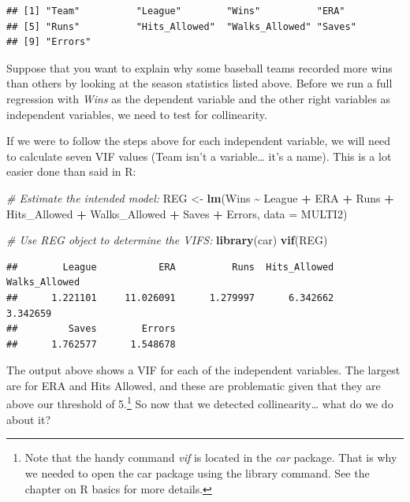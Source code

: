 \documentclass[
]{book}
\newenvironment{Shaded}{\begin{snugshade}}{\end{snugshade}}
\newcommand{\AttributeTok}[1]{\textcolor[rgb]{0.13,0.29,0.53}{#1}}
\newcommand{\CommentTok}[1]{\textcolor[rgb]{0.56,0.35,0.01}{\textit{#1}}}
\newcommand{\FunctionTok}[1]{\textcolor[rgb]{0.13,0.29,0.53}{\textbf{#1}}}
\newcommand{\NormalTok}[1]{#1}
\newcommand{\OtherTok}[1]{\textcolor[rgb]{0.56,0.35,0.01}{#1}}
\newcommand{\SpecialCharTok}[1]{\textcolor[rgb]{0.81,0.36,0.00}{\textbf{#1}}}
\begin{document}
\begin{verbatim}
## [1] "Team"          "League"        "Wins"          "ERA"          
## [5] "Runs"          "Hits_Allowed"  "Walks_Allowed" "Saves"        
## [9] "Errors"
\end{verbatim}

Suppose that you want to explain why some baseball teams recorded more wins than others by looking at the season statistics listed above. Before we run a full regression with \emph{Wins} as the dependent variable and the other right variables as independent variables, we need to test for collinearity.

If we were to follow the steps above for each independent variable, we will need to calculate seven VIF values (Team isn't a variable\ldots{} it's a name). This is a lot easier done than said in R:

\begin{Shaded}
\begin{Highlighting}[]
\CommentTok{\# Estimate the \textquotesingle{}intended\textquotesingle{} model:}
\NormalTok{REG }\OtherTok{\textless{}{-}} \FunctionTok{lm}\NormalTok{(Wins }\SpecialCharTok{\textasciitilde{}}\NormalTok{ League }\SpecialCharTok{+}\NormalTok{ ERA }\SpecialCharTok{+}\NormalTok{ Runs }\SpecialCharTok{+}\NormalTok{ Hits\_Allowed }\SpecialCharTok{+} 
\NormalTok{            Walks\_Allowed }\SpecialCharTok{+}\NormalTok{ Saves }\SpecialCharTok{+}\NormalTok{ Errors, }\AttributeTok{data =}\NormalTok{ MULTI2)}

\CommentTok{\# Use REG object to determine the VIFS:}
\FunctionTok{library}\NormalTok{(car)}
\FunctionTok{vif}\NormalTok{(REG)}
\end{Highlighting}
\end{Shaded}

\begin{verbatim}
##        League           ERA          Runs  Hits_Allowed Walks_Allowed 
##      1.221101     11.026091      1.279997      6.342662      3.342659 
##         Saves        Errors 
##      1.762577      1.548678
\end{verbatim}

The output above shows a VIF for each of the independent variables. The largest are for ERA and Hits Allowed, and these are problematic given that they are above our threshold of 5.\footnote{Note that the handy command \emph{vif} is located in the \emph{car} package. That is why we needed to open the car package using the library command. See the chapter on R basics for more details.} So now that we detected collinearity\ldots{} what do we do about it?
\end{document}
